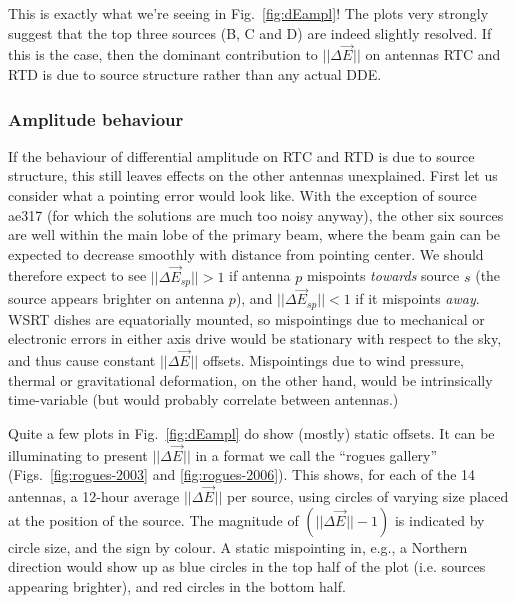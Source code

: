 \documentclass[]{aa}
\newcommand{\jones}[2]{\vec {#1}_{#2}}
\begin{document}
This is exactly what we're seeing in Fig.~\ref{fig:dEampl}! The plots very strongly suggest that the top three sources (B, C and D) are indeed slightly resolved. If this is the case, then the dominant contribution to $||\Delta\jones{E}{}||$ on antennas RTC and RTD is due to source structure rather than any actual DDE. 

\subsubsection{Amplitude behaviour}

If the behaviour of differential amplitude on RTC and RTD is due to source structure, this still leaves effects on the other antennas unexplained. First let us consider what a pointing error would look like. With the exception of source ae317 (for which the solutions are much too noisy anyway), the other six sources are well within the main lobe of the primary beam, where the beam gain can be expected to decrease smoothly with distance from pointing center. We should therefore expect to see $||\Delta\jones{E}{sp}||>1$ if antenna $p$ mispoints \emph{towards} source $s$ (the source appears brighter on antenna $p$), and $||\Delta\jones{E}{sp}||<1$ if it mispoints \emph{away}. WSRT dishes are equatorially mounted, so mispointings due to mechanical or electronic errors in either axis drive would be stationary with respect to the sky, and thus cause constant 
$||\Delta\jones{E}{}||$ offsets. Mispointings due to wind pressure, thermal or gravitational deformation, on the other hand, would be intrinsically time-variable (but would probably correlate between antennas.)

Quite a few plots in Fig.~\ref{fig:dEampl} do show (mostly) static offsets. It can be illuminating to present $||\Delta\jones{E}{}||$ in a format we call the ``rogues gallery'' (Figs.~\ref{fig:rogues-2003} and \ref{fig:rogues-2006}). This shows, for each of the 14 antennas, a 12-hour average $||\Delta\jones{E}{}||$ per source, using circles of varying size placed at the position of the source. The magnitude of $(||\Delta\jones{E}{}||-1)$ is indicated by circle size, and the sign by colour. A static mispointing in, e.g., a Northern direction would show up as blue circles in the top half of the plot (i.e. sources appearing brighter), and red circles in the bottom half.

\newlength{\roguewidth}
\setlength{\roguewidth}{.2\columnwidth} %
\end{document}

